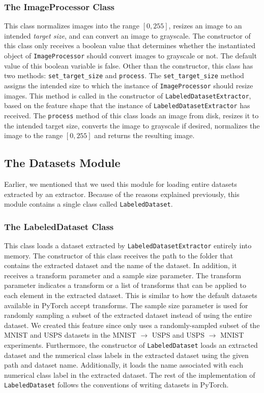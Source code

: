 \documentclass[14pt]{extarticle}
\begin{document}
		\subsubsection{The ImageProcessor Class}
		This class normalizes images into the range $[0, 255]$, resizes an image to an intended \textit{target size}, and can convert an image to grayscale. The constructor of this class only receives a boolean value that determines whether the instantiated object of \texttt{ImageProcessor} should convert images to grayscale or not. The default value of this boolean variable is false. Other than the constructor, this class has two methods: \texttt{set\_target\_size} and \texttt{process}. The \texttt{set\_target\_size} method assigns the intended size to which the instance of \texttt{ImageProcessor} should resize images. This method is called in the constructor of \texttt{LabeledDatasetExtractor}, based on the feature shape that the instance of \texttt{LabeledDatasetExtractor} has received. The \texttt{process} method of this class loads an image from disk, resizes it to the intended target size, converts the image to grayscale if desired, normalizes the image to the range $[0, 255]$ and returns the resulting image.
		\subsection{The Datasets Module}
		Earlier, we mentioned that we used this module for loading entire datasets extracted by an extractor. Because of the reasons explained previously, this module contains a single class called \texttt{LabeledDataset}.
		\subsubsection{The LabeledDataset Class}
		This class loads a dataset extracted by \texttt{LabeledDatasetExtractor} entirely into memory. The constructor of this class receives the path to the folder that contains the extracted dataset and the name of the dataset. In addition, it receives a transform parameter and a sample size parameter. The transform parameter indicates a transform or a list of transforms that can be applied to each element in the extracted dataset. This is similar to how the default datasets available in PyTorch accept transforms. The sample size parameter is used for randomly sampling a subset of the extracted dataset instead of using the entire dataset. We created this feature since \cite{adda} only uses a randomly-sampled subset of the MNIST \cite{mnist} and USPS \cite{usps} datasets in the MNIST $\rightarrow$ USPS and USPS $\rightarrow$ MNIST experiments. Furthermore, the constructor of \texttt{LabeledDataset} loads an extracted dataset and the numerical class labels in the extracted dataset using the given path and dataset name. Additionally, it loads the name associated with each numerical class label in the extracted dataset. The rest of the implementation of \texttt{LabeledDataset} follows the conventions of writing datasets in PyTorch.
		\pagebreak
\end{document}

